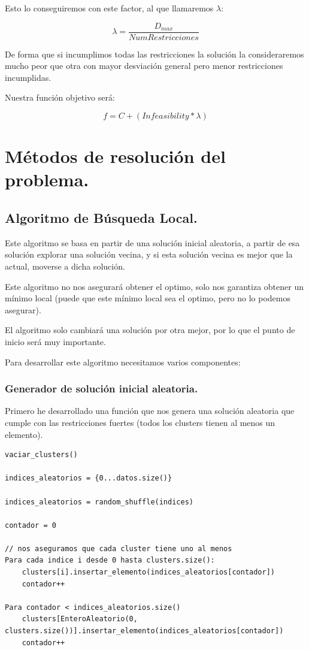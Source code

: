 \documentclass[12pt, spanish]{article}
\begin{document}
Esto lo conseguiremos con este factor, al que llamaremos $\lambda$:

$$ \lambda = \frac{D_{max}}{NumRestricciones} $$ 


De forma que si incumplimos todas las restricciones la solución la consideraremos mucho peor que otra con mayor desviación general pero menor restricciones incumplidas.

Nuestra función objetivo será:

$$ f = C + (\textit{Infeasibility} * \lambda) $$ 


\newpage

\section{Métodos de resolución del problema.}

\subsection{Algoritmo de Búsqueda Local.}

Este algoritmo se basa en partir de una solución inicial aleatoria, a partir de esa solución explorar una solución vecina, y si esta solución vecina es mejor que la actual, moverse a dicha solución.

Este algoritmo no nos asegurará obtener el optimo, solo nos garantiza obtener un mínimo local (puede que este mínimo local sea el optimo, pero no lo podemos asegurar).

El algoritmo solo cambiará una solución por otra mejor, por lo que el punto de inicio será muy importante.

Para desarrollar este algoritmo necesitamos varios componentes:
 
 \subsubsection{Generador de solución inicial aleatoria.}
 
 Primero he desarrollado una función que nos genera una solución aleatoria que cumple con las restricciones fuertes (todos los clusters tienen al menos un elemento).
 
 \begin{lstlisting}
vaciar_clusters()

indices_aleatorios = {0...datos.size()}

indices_aleatorios = random_shuffle(indices)

contador = 0

// nos aseguramos que cada cluster tiene uno al menos
Para cada indice i desde 0 hasta clusters.size():
	clusters[i].insertar_elemento(indices_aleatorios[contador])
	contador++
	
Para contador < indices_aleatorios.size()
	clusters[EnteroAleatorio(0, clusters.size())].insertar_elemento(indices_aleatorios[contador])
	contador++
	

\end{lstlisting}
 
\end{document}
